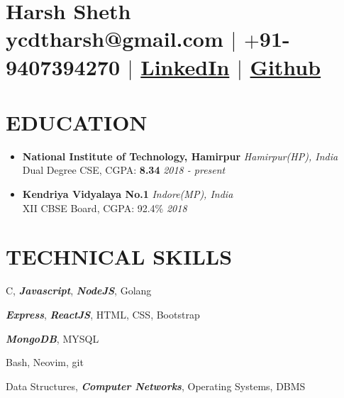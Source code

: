 \documentclass[12pt]{article}
\begin{document}
\section{Harsh Sheth\\ \normalfont ycdtharsh@gmail.com $|$ \normalfont $+$91-9407394270 $|$  \href{https://www.linkedin.com/in/harsh-sheth-2101}{LinkedIn} $|$ \href{https://github.com/harsh-sheth}{Github}}

\section{EDUCATION}
\begin{itemize}
  \item{
      \textbf{National Institute of Technology, Hamirpur} \hfill \textit{Hamirpur(HP), India}\\
      Dual Degree CSE, CGPA: \textbf{8.34} \hfill \textit{2018 - present}
  } 
  \item{
      \textbf{Kendriya Vidyalaya No.1} \hfill \textit{Indore(MP), India}\\
      XII CBSE Board, CGPA: 92.4\% \hfill \textit{2018}
  }
\end{itemize}

\section{TECHNICAL SKILLS}
\begin{description}
  \setlength{\itemindent}{\parindent}
  \item[\normalfont Languages:]{C, \textbf{\textit{Javascript}}, \textbf{\textit{NodeJS}}, Golang}
  \item[\normalfont Web Technologies:]{\textbf{\textit{Express}}, \textbf{\textit{ReactJS}}, HTML, CSS, Bootstrap}
  \item[\normalfont Databases:]{\textbf{\textit{MongoDB}}, MYSQL}
  \item[\normalfont Tools:]{Bash, Neovim, git}
  \item[\normalfont Coursework:]{Data Structures, \textbf{\textit{Computer Networks}}, Operating Systems, DBMS}
\end{description}

\end{document}
